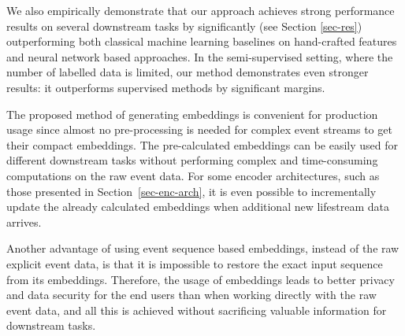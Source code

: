 \documentclass{article}
\begin{document}
We also empirically demonstrate that our approach achieves strong performance results on several downstream tasks by significantly (see Section \ref{sec-res}) outperforming both classical machine learning baselines on hand-crafted features and neural network based approaches.
In the semi-supervised setting, where the number of labelled data is limited, our method demonstrates even stronger results: it outperforms supervised methods by significant margins.

The proposed method of generating embeddings is convenient for production usage since almost no pre-processing is needed for complex event streams to get their compact embeddings. The pre-calculated embeddings can be easily used for different downstream tasks without performing complex and time-consuming computations on the raw event data. For some encoder architectures, such as those presented in Section~\ref{sec-enc-arch}, it is even possible to incrementally update the already calculated embeddings when additional new lifestream data arrives.

Another advantage of using event sequence based embeddings, instead of the raw explicit event data, is that it is impossible to restore the exact input sequence from its embeddings. Therefore, the usage of embeddings leads to better privacy and data security for the end users than when working directly with the raw event data, and all this is achieved without sacrificing valuable information for downstream tasks.



\end{document}
